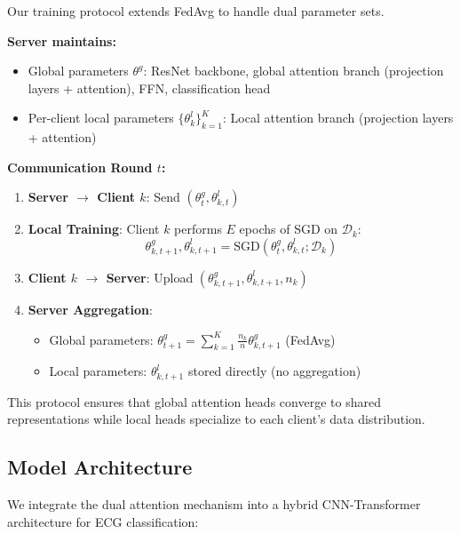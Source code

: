 Our training protocol extends FedAvg to handle dual parameter sets.

\textbf{Server maintains:}
\begin{itemize}
    \item Global parameters $\theta^g$: ResNet backbone, global attention branch (projection layers + attention), FFN, classification head
    \item Per-client local parameters $\{\theta^l_k\}_{k=1}^K$: Local attention branch (projection layers + attention)
\end{itemize}

\textbf{Communication Round $t$:}

\begin{enumerate}
    \item \textbf{Server $\rightarrow$ Client $k$}: Send $(\theta^g_t, \theta^l_{k,t})$

    \item \textbf{Local Training}: Client $k$ performs $E$ epochs of SGD on $\mathcal{D}_k$:
    \begin{equation}
    \theta^g_{k,t+1}, \theta^l_{k,t+1} = \text{SGD}(\theta^g_t, \theta^l_{k,t}; \mathcal{D}_k)
    \end{equation}

    \item \textbf{Client $k$ $\rightarrow$ Server}: Upload $(\theta^g_{k,t+1}, \theta^l_{k,t+1}, n_k)$

    \item \textbf{Server Aggregation}:
    \begin{itemize}
        \item Global parameters: $\theta^g_{t+1} = \sum_{k=1}^K \frac{n_k}{n} \theta^g_{k,t+1}$ (FedAvg)
        \item Local parameters: $\theta^l_{k,t+1}$ stored directly (no aggregation)
    \end{itemize}
\end{enumerate}

This protocol ensures that global attention heads converge to shared representations while local heads specialize to each client's data distribution.

\subsection{Model Architecture}

We integrate the dual attention mechanism into a hybrid CNN-Transformer architecture for ECG classification:

